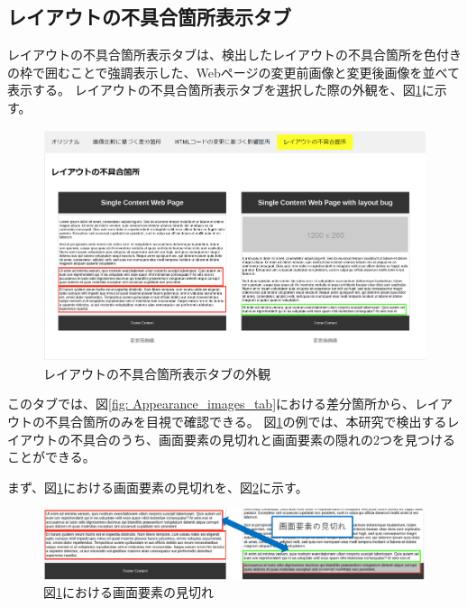 \subsection{レイアウトの不具合箇所表示タブ}\label{subsec:subeffect_tab}
レイアウトの不具合箇所表示タブは、検出したレイアウトの不具合箇所を色付きの枠で囲むことで強調表示した、Webページの変更前画像と変更後画像を並べて表示する。
レイアウトの不具合箇所表示タブを選択した際の外観を、図\ref{fig: Appearance_subEffect_tab}に示す。
\begin{figure}[tp]
    \begin{center}
        \includegraphics[width=1.0\columnwidth]{image/3_subEffect_tab2.png}
        \caption{レイアウトの不具合箇所表示タブの外観}
        \label{fig: Appearance_subEffect_tab}
    \end{center}
\end{figure}
このタブでは、図\ref{fig: Appearance_images_tab}における差分箇所から、レイアウトの不具合箇所のみを目視で確認できる。
図\ref{fig: Appearance_subEffect_tab}の例では、本研究で検出するレイアウトの不具合のうち、画面要素の見切れと画面要素の隠れの2つを見つけることができる。
\par
まず、図\ref{fig: Appearance_subEffect_tab}における画面要素の見切れを、図\ref{fig: out_of_element}に示す。
\begin{figure}[tp]
    \begin{center}
        \includegraphics[width=1.0\columnwidth]{image/3_out_of_element2.png}
        \caption{図\ref{fig: Appearance_subEffect_tab}における画面要素の見切れ}
        \label{fig: out_of_element}
    \end{center}
\end{figure}
